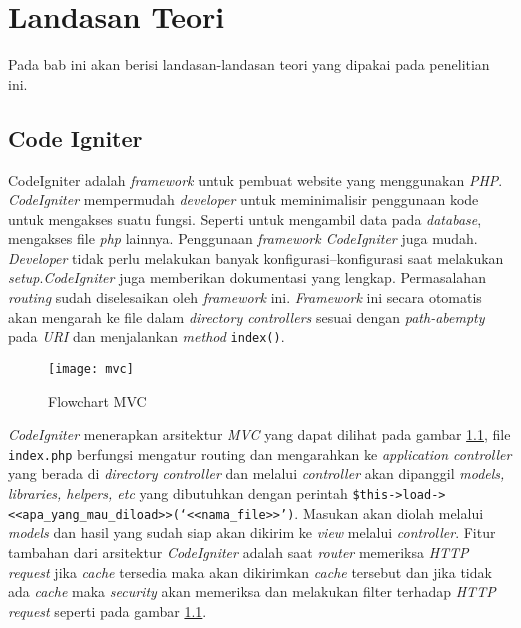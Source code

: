 \chapter{Landasan Teori}
\label{chap:teori}


Pada bab ini akan berisi landasan-landasan teori yang dipakai pada penelitian ini.

\section{Code Igniter}
\label{sec:codeigniter}


CodeIgniter\cite{codeigniter3} adalah \textit{framework} untuk pembuat website yang menggunakan \textit{PHP}. \textit{CodeIgniter} mempermudah \textit{developer} untuk meminimalisir penggunaan kode untuk mengakses suatu fungsi. Seperti untuk mengambil data pada \textit{database}, mengakses file \textit{php} lainnya. Penggunaan \textit{framework CodeIgniter} juga mudah.\textit{ Developer} tidak perlu melakukan banyak konfigurasi--konfigurasi saat melakukan \textit{setup}.\textit{CodeIgniter} juga memberikan dokumentasi yang lengkap. Permasalahan \textit{routing}  sudah diselesaikan oleh \textit{framework} ini. \textit{ Framework} ini secara otomatis akan mengarah ke file dalam \textit{directory controllers} sesuai dengan \textit{path-abempty} pada \textit{URI}  dan menjalankan \textit{method} \texttt{index()}.


\begin{figure}[H]
	\centering
	\texttt{[image: mvc]} 
	\caption{Flowchart MVC}
	\label{fig:appflowchart} 
\end{figure}


\textit{CodeIgniter} menerapkan arsitektur \textit{MVC} yang dapat dilihat pada gambar \ref{fig:appflowchart}, file \texttt{index.php} berfungsi mengatur routing dan mengarahkan ke \textit{application controller} yang berada di \textit{directory controller} dan melalui \textit{controller} akan dipanggil \textit{models, libraries, helpers, etc} yang dibutuhkan dengan perintah \texttt{\$this->load-><<apa\_yang\_mau\_diload>>(\lq<<nama\_file>>\rq)}. Masukan akan diolah melalui \textit{models} dan hasil yang sudah siap akan dikirim ke \textit{view} melalui \textit{controller}. Fitur tambahan dari arsitektur \textit{CodeIgniter} adalah saat \textit{router} memeriksa \textit{HTTP request} jika \textit{cache} tersedia maka akan dikirimkan \textit{cache} tersebut dan jika tidak ada \textit{cache} maka \textit{security} akan memeriksa dan melakukan filter terhadap \textit{HTTP request} seperti pada gambar \ref{fig:appflowchart}. 

